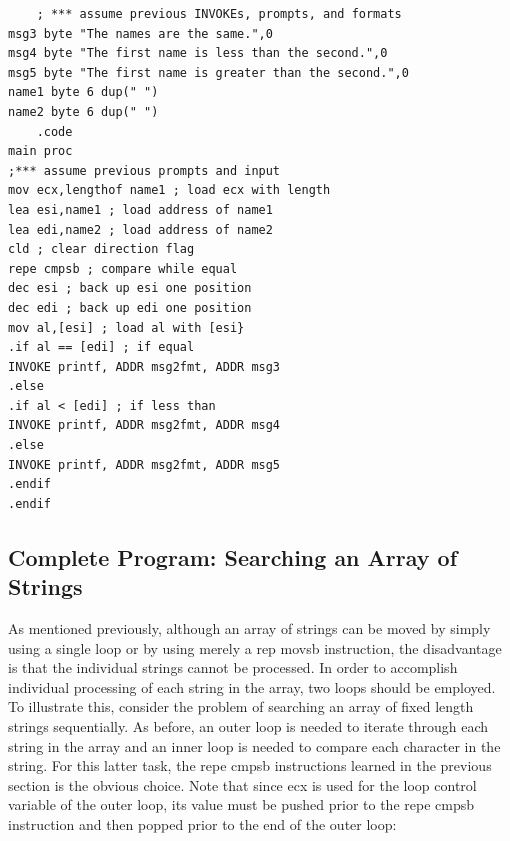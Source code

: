 \documentclass[10pt]{book}
\begin{document}
\begin{verbatim}
    ; *** assume previous INVOKEs, prompts, and formats
msg3 byte "The names are the same.",0
msg4 byte "The first name is less than the second.",0
msg5 byte "The first name is greater than the second.",0
name1 byte 6 dup(" ")
name2 byte 6 dup(" ")
    .code
main proc
;*** assume previous prompts and input
mov ecx,lengthof name1 ; load ecx with length
lea esi,name1 ; load address of name1
lea edi,name2 ; load address of name2
cld ; clear direction flag
repe cmpsb ; compare while equal
dec esi ; back up esi one position
dec edi ; back up edi one position
mov al,[esi] ; load al with [esi}
.if al == [edi] ; if equal
INVOKE printf, ADDR msg2fmt, ADDR msg3
.else
.if al < [edi] ; if less than
INVOKE printf, ADDR msg2fmt, ADDR msg4
.else
INVOKE printf, ADDR msg2fmt, ADDR msg5
.endif
.endif
\end{verbatim}

\subsection{Complete Program: Searching an Array of Strings}
As mentioned previously, although an array of strings can be moved by simply using a single loop or by using merely a rep movsb instruction, the disadvantage is that the individual strings cannot be processed. In order to accomplish individual processing of each string in the array, two loops should be employed. To illustrate this, consider the problem of searching an array of fixed length strings sequentially. As before, an outer loop is needed to iterate through each string in the array and an inner loop is needed to compare each character in the string. For this latter task, the repe cmpsb instructions learned in the previous section is the obvious choice. Note that since ecx is used for the loop control variable of the outer loop, its value must be pushed prior to the repe cmpsb instruction and then popped prior to the end of the outer loop:
\end{document}
